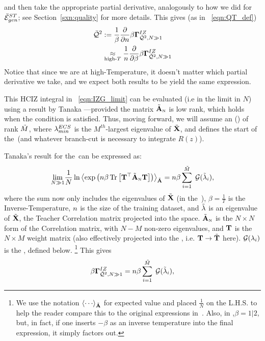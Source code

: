 and then take the appropriate partial derivative,
analogously to how we did for $\bar{\mathcal{E}}^{ST}_{gen}$; see Section~\ref{sxn:quality} for more details.
This gives (as in \EQN~\ref{eqn:QT_def})
\begin{align}
\label{eqn:IZG_generate_Q2}
\QT &:= \frac{1}{\beta}\frac{\partial }{\partial \ND}\IZGINF  \\ 
&\underset{\text{high-}T}{\approx}
\frac{1}{\ND}\frac{\partial }{\partial \beta}\IZGINF 
\end{align}
Notice that since we are at high-Temperature, it doesn't matter which partial derivative we take,
and we expect both results to be yield the same expression.

This HCIZ integral in \EQN~\ref{eqn:IZG_limit} can be evaluated
(i.e in the \LargeN limit in $N$) using a result by Tanaka ---provided
the matrix $\tilde{\mathbf{A}}_{\text{\tiny N}}$ is low rank, which holds when the \TRACELOG condition is satisfied.
Thus, moving forward, we will assume an
\EffectiveCorrelationSpace (\ECS) of rank $\tilde{M}$, where $\lambda^{ECS}_{min}$ is the $M^{th}$-largest eigenvalue of $\tilde{\mathbf{X}}$,
and defines the start of the~\ECS (and whatever branch-cut is necessary to integrate $R(z)$).

Tanaka's result for the~\ECS can be expressed as:
\begin{equation}
  \label{eqn:tanaka_result}
  \underset{N\gg 1}{\lim}\frac{1}{N}\ln
\Expected[\AECS]{\exp\left(\ND\beta \Trace{\TMAT^{\top}\AECSN\TMAT}\right)}
  =\ND\beta\sum\limits_{i=1}^{\MECS}\;\GNECSI,
\end{equation}
where the sum now only includes the eigenvalues of $\tilde{\mathbf{X}}$ (in the~\ECS), $\beta=\tfrac{1}{T}$
is the Inverse-Temperature, $n$ is the size of the training dataset, and $\tilde{\lambda}$ is an eigenvalue of $\tilde{\mathbf{X}}$, the Teacher
Correlation matrix projected into the \ECS space.
$\tilde{\mathbf{A}}_{\text{\tiny N}}$ is the $N \times N$ form of the \Student Correlation matrix,
with $N-M$ non-zero eigenvalues, and ${\mathbf{T}}$ is the $N\times M$ \Teacher  weight matrix
(also effectively projected into the \ECS, i.e. ${\mathbf{T}}\rightarrow\tilde{\mathbf{T}}$ here).
$\mathcal{G}(\lambda_{i})$ is the \GEN, defined below.
\footnote{We use the notation $\Expected[\AECS]{\cdots}$ for expected value and placed $\tfrac{1}{N}$ on the L.H.S.
to help the reader compare this to the original expressions in~\cite{Tanaka2007, Tanaka2008}.
Also,  in \cite{Tanaka2007, Tanaka2008},$\beta=1|2$, but, in fact, if one inserts $-\beta$ as an inverse temperature into the final expression, it simply factors out.}
This gives
\begin{equation}
\label{eqn:tanaka_result2}
\IZGINF = \ND\beta\sum\limits_{i=1}^{\MECS}\;\GNECSI,
\end{equation}


